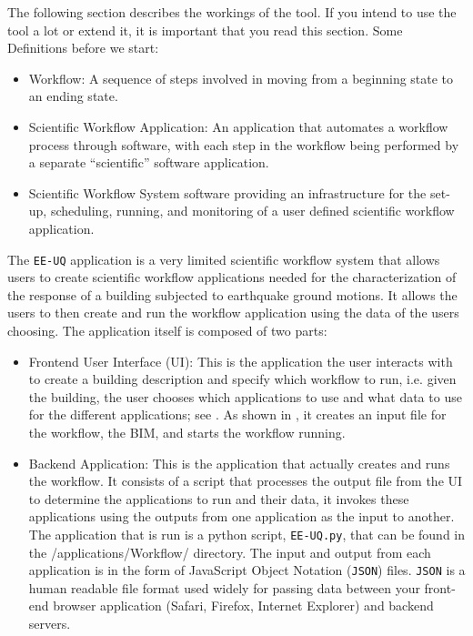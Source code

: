 The following section describes the workings of the tool. If you
intend to use the tool a lot or extend it, it is important that you
read this section.  Some Definitions before we start:
\begin{itemize}
\item Workflow: A sequence of steps involved in moving from a
  beginning state to an ending state.
\item Scientific Workflow Application: An application that automates a
  workflow process through software, with each step in the workflow
  being performed by a separate “scientific” software application.
\item Scientific Workflow System software providing an infrastructure
  for the set-up, scheduling, running, and monitoring of a user
  defined scientific workflow application.
\end{itemize}

The \texttt{EE-UQ} application is a very limited scientific workflow system
that allows users to create scientific workflow applications needed
for the characterization of the response of a building subjected to
earthquake ground motions. It allows the users to then create and run
the workflow application using the data of the users choosing. The
application itself is composed of two parts:

\begin{itemize}
\item Frontend User Interface (UI): This is the application the user
  interacts with to create a building description and
  specify which workflow to run, i.e. given the building, the user
  chooses which applications to use and what data to use for the
  different applications; see . As shown in , it 
  creates an input file for the workflow, the BIM, and starts the workflow running.  
\item Backend Application: This is the application that actually
  creates and runs the workflow. It consists of a script that
  processes the output file from the UI to determine the applications
  to run and their data, it invokes these applications using the
  outputs from one application as the input to another. The
  application that is run is a python script, \texttt{EE-UQ.py}, that can be
  found in the /applications/Workflow/ directory.  The input and
  output from each application is in the form of JavaScript Object
  Notation (\texttt{JSON}) files. \texttt{JSON} is a human readable file format used
  widely for passing data between your front-end browser application
  (Safari, Firefox, Internet Explorer) and backend servers.
\end{itemize}


